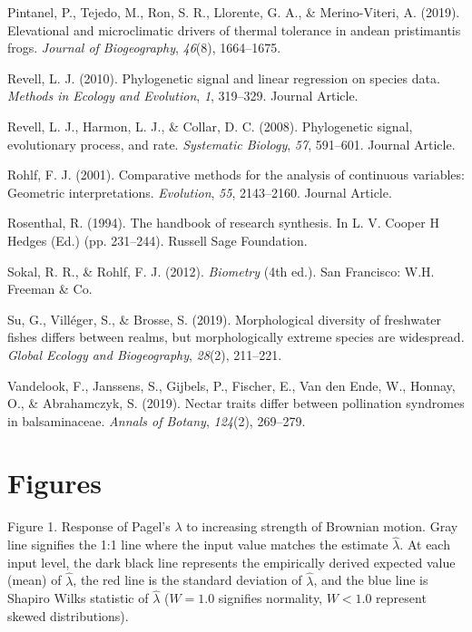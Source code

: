 \documentclass[
]{article}
\begin{document}
\leavevmode\hypertarget{ref-Pintanel2019}{}%
Pintanel, P., Tejedo, M., Ron, S. R., Llorente, G. A., \& Merino-Viteri,
A. (2019). Elevational and microclimatic drivers of thermal tolerance in
andean pristimantis frogs. \emph{Journal of Biogeography}, \emph{46}(8),
1664--1675.

\leavevmode\hypertarget{ref-Revell2010}{}%
Revell, L. J. (2010). Phylogenetic signal and linear regression on
species data. \emph{Methods in Ecology and Evolution}, \emph{1},
319--329. Journal Article.

\leavevmode\hypertarget{ref-Revell_et_al2008}{}%
Revell, L. J., Harmon, L. J., \& Collar, D. C. (2008). Phylogenetic
signal, evolutionary process, and rate. \emph{Systematic Biology},
\emph{57}, 591--601. Journal Article.

\leavevmode\hypertarget{ref-Rohlf2001}{}%
Rohlf, F. J. (2001). Comparative methods for the analysis of continuous
variables: Geometric interpretations. \emph{Evolution}, \emph{55},
2143--2160. Journal Article.

\leavevmode\hypertarget{ref-Rosenthal1994}{}%
Rosenthal, R. (1994). The handbook of research synthesis. In L. V.
Cooper H Hedges (Ed.) (pp. 231--244). Russell Sage Foundation.

\leavevmode\hypertarget{ref-SokalRohlf2012}{}%
Sokal, R. R., \& Rohlf, F. J. (2012). \emph{Biometry} (4th ed.). San
Francisco: W.H. Freeman \& Co.

\leavevmode\hypertarget{ref-Su2019}{}%
Su, G., Villéger, S., \& Brosse, S. (2019). Morphological diversity of
freshwater fishes differs between realms, but morphologically extreme
species are widespread. \emph{Global Ecology and Biogeography},
\emph{28}(2), 211--221.

\leavevmode\hypertarget{ref-Vandelook2019}{}%
Vandelook, F., Janssens, S., Gijbels, P., Fischer, E., Van den Ende, W.,
Honnay, O., \& Abrahamczyk, S. (2019). Nectar traits differ between
pollination syndromes in balsaminaceae. \emph{Annals of Botany},
\emph{124}(2), 269--279.

\newpage

\hypertarget{figures}{%
\section{Figures}\label{figures}}

Figure 1. Response of Pagel's \(\lambda\) to increasing strength of
Brownian motion. Gray line signifies the 1:1 line where the input value
matches the estimate \(\hat\lambda\). At each input level, the dark
black line represents the empirically derived expected value (mean) of
\(\hat\lambda\), the red line is the standard deviation of
\(\hat\lambda\), and the blue line is Shapiro Wilks statistic of
\(\hat\lambda\) (\(W=1.0\) signifies normality, \(W< 1.0\) represent
skewed distributions). \hfill\break
\end{document}

